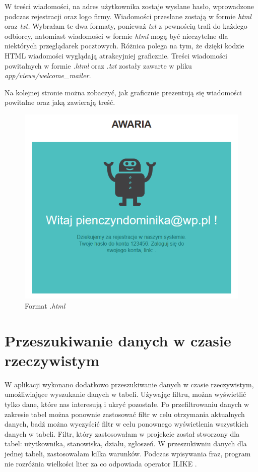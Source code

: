 \documentclass[openright]{xmgr}
\begin{document}
	W treści wiadomości, na adres użytkownika zostaje wysłane hasło, wprowadzone podczas rejestracji oraz logo firmy. Wiadomości przesłane zostają w formie \textit{html} oraz \textit{txt.} Wybrałam te dwa formaty, ponieważ \textit{txt} z pewnością trafi do każdego odbiorcy, natomiast wiadomości w formie \textit{html} mogą być nieczytelne dla niektórych przeglądarek pocztowych. Różnica polega na tym, że dzięki kodzie HTML wiadomości wyglądają atrakcyjniej graficznie.
	Treści wiadomości powitalnych w formie \textit{.html} oraz \textit{.txt} zostały zawarte w pliku \textit{app/views/welcome\_mailer.}
	
	Na kolejnej stronie można zobaczyć, jak graficznie prezentują się wiadomości powitalne oraz jaką zawierają treść. 
	\newpage
	\begin{figure}[!tbh]
		\centering
		\includegraphics[width=\linewidth]{image/e-mail}
		\caption{Format \textit{.html}}
	\end{figure}
	\newpage
	\section{Przeszukiwanie danych w czasie rzeczywistym}
	
	W aplikacji wykonano dodatkowo przeszukiwanie danych w czasie rzeczywistym, umożliwiające wyszukanie danych w tabeli. Używając filtru, można wyświetlić tylko dane, które nas interesują i ukryć pozostałe. Po przefiltrowaniu danych w zakresie tabel można ponownie zastosować filtr w celu otrzymania aktualnych danych, badź można wyczyścić filtr w celu ponownego wyświetlenia wszystkich danych w tabeli. 
	Filtr, który zastosowałam w projekcie został stworzony dla tabel: użytkownika, stanowiska, działu, zgłoszeń. W przeszukiwniu danych dla jednej tabeli, zastosowałam kilka warunków. Podczas wpisywania fraz, program nie rozróżnia wielkości liter za co odpowiada operator ILIKE .\\
	
\end{document}
